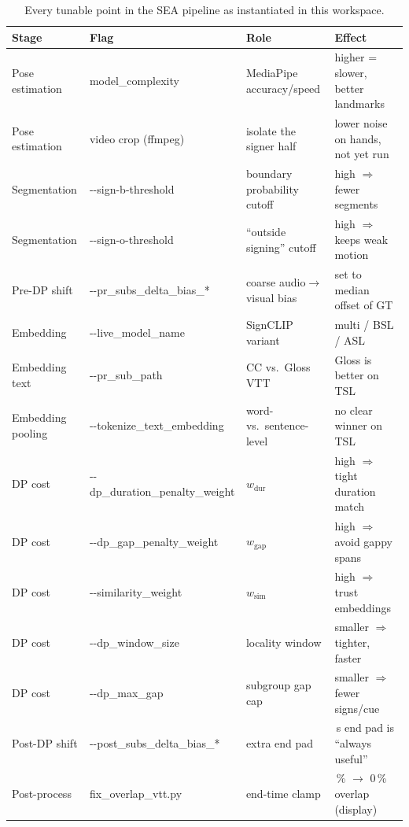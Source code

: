\documentclass[11pt,a4paper]{article}
\def\texttt#1{#1}%
\def\textbf#1{#1}%
\begin{document}
\begin{table}[h]
\centering
\small
\small
\begin{tabularx}{\linewidth}{@{}>{\raggedright\arraybackslash}p{22mm}
                              >{\raggedright\arraybackslash}p{47mm}
                              >{\raggedright\arraybackslash}X
                              >{\raggedright\arraybackslash}X@{}}
\toprule
\textbf{Stage} & \textbf{Flag} & \textbf{Role} & \textbf{Effect} \\
\midrule
Pose estimation     & \texttt{model\_complexity}            & MediaPipe accuracy/speed   & higher = slower, better landmarks \\
Pose estimation     & video crop (ffmpeg)                   & isolate the signer half    & lower noise on hands, not yet run \\
Segmentation        & \texttt{-{}-sign-b-threshold}         & boundary probability cutoff& high $\Rightarrow$ fewer segments \\
Segmentation        & \texttt{-{}-sign-o-threshold}         & ``outside signing'' cutoff & high $\Rightarrow$ keeps weak motion \\
Pre-DP shift        & \texttt{-{}-pr\_subs\_delta\_bias\_*} & coarse audio$\to$visual bias & set to median offset of GT \\
Embedding           & \texttt{-{}-live\_model\_name}        & SignCLIP variant           & multi / BSL / ASL \\
Embedding text      & \texttt{-{}-pr\_sub\_path}            & CC vs.\ Gloss VTT          & Gloss is better on TSL \\
Embedding pooling   & \texttt{-{}-tokenize\_text\_embedding}& word- vs.\ sentence-level  & no clear winner on TSL \\
DP cost             & \texttt{-{}-dp\_duration\_penalty\_weight} & $w_{\mathrm{dur}}$    & high $\Rightarrow$ tight duration match \\
DP cost             & \texttt{-{}-dp\_gap\_penalty\_weight} & $w_{\mathrm{gap}}$         & high $\Rightarrow$ avoid gappy spans \\
DP cost             & \texttt{-{}-similarity\_weight}       & $w_{\mathrm{sim}}$         & high $\Rightarrow$ trust embeddings \\
DP cost             & \texttt{-{}-dp\_window\_size}         & locality window            & smaller $\Rightarrow$ tighter, faster \\
DP cost             & \texttt{-{}-dp\_max\_gap}             & subgroup gap cap           & smaller $\Rightarrow$ fewer signs/cue \\
Post-DP shift       & \texttt{-{}-post\_subs\_delta\_bias\_*} & extra end pad            & 1\,s end pad is ``always useful'' \\
Post-process        & \texttt{fix\_overlap\_vtt.py}         & end-time clamp             & 88\,\% $\to$ 0\,\% overlap (display) \\
\bottomrule
\end{tabularx}
\caption{Every tunable point in the SEA pipeline as instantiated in this
workspace.}
\label{tab:tunable}
\end{table}
\end{document}
